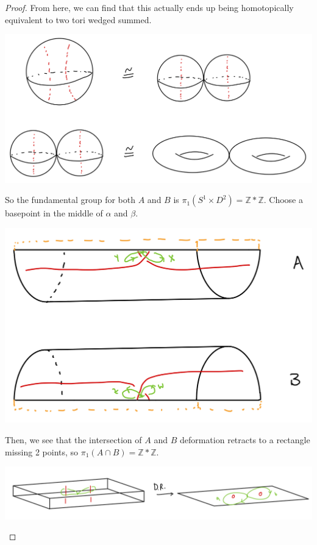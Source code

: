 \documentclass[12pt]{article}
\begin{document}
\begin{proof}
  From here, we can find that this actually ends up being homotopically equivalent to two tori wedged summed. 
  \par \begin{center} \includegraphics[scale=.2]{1-3.png} \end{center} 
  So the fundamental group for both $A$ and $B$ is $\pi_1(S^1 \times D^2) = \mathbb{Z} * \mathbb{Z}$. Choose a 
  basepoint in the middle of $\alpha$ and $\beta$. 
  \par \begin{center} \includegraphics[scale=.2]{1-4.png} \end{center}
  Then, we see that the intersection of $A$ and $B$ deformation retracts to a rectangle missing 2 points, so $\pi_1(A \cap B) = \mathbb{Z} * \mathbb{Z}$. 
  \par \begin{center} \includegraphics[scale=.2]{1-5.png} \end{center}

\end{proof}
\end{document}
